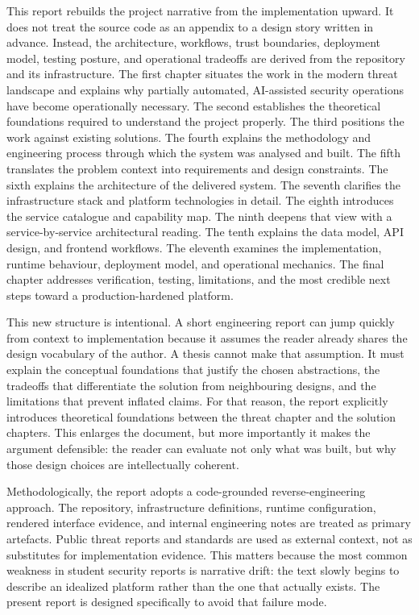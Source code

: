 This report rebuilds the project narrative from the implementation upward. It does not treat the source code as an appendix to a design story written in advance. Instead, the architecture, workflows, trust boundaries, deployment model, testing posture, and operational tradeoffs are derived from the repository and its infrastructure. The first chapter situates the work in the modern threat landscape and explains why partially automated, AI-assisted security operations have become operationally necessary. The second establishes the theoretical foundations required to understand the project properly. The third positions the work against existing solutions. The fourth explains the methodology and engineering process through which the system was analysed and built. The fifth translates the problem context into requirements and design constraints. The sixth explains the architecture of the delivered system. The seventh clarifies the infrastructure stack and platform technologies in detail. The eighth introduces the service catalogue and capability map. The ninth deepens that view with a service-by-service architectural reading. The tenth explains the data model, API design, and frontend workflows. The eleventh examines the implementation, runtime behaviour, deployment model, and operational mechanics. The final chapter addresses verification, testing, limitations, and the most credible next steps toward a production-hardened platform.

This new structure is intentional. A short engineering report can jump quickly from context to implementation because it assumes the reader already shares the design vocabulary of the author. A thesis cannot make that assumption. It must explain the conceptual foundations that justify the chosen abstractions, the tradeoffs that differentiate the solution from neighbouring designs, and the limitations that prevent inflated claims. For that reason, the report explicitly introduces theoretical foundations between the threat chapter and the solution chapters. This enlarges the document, but more importantly it makes the argument defensible: the reader can evaluate not only what was built, but why those design choices are intellectually coherent.

Methodologically, the report adopts a code-grounded reverse-engineering approach. The repository, infrastructure definitions, runtime configuration, rendered interface evidence, and internal engineering notes are treated as primary artefacts. Public threat reports and standards are used as external context, not as substitutes for implementation evidence. This matters because the most common weakness in student security reports is narrative drift: the text slowly begins to describe an idealized platform rather than the one that actually exists. The present report is designed specifically to avoid that failure mode.
